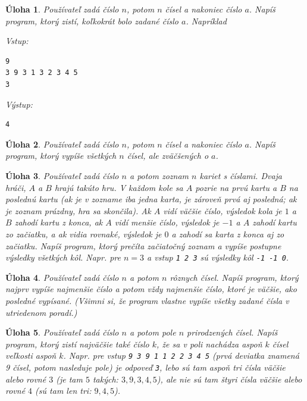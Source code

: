 \documentclass[10pt]{article}
\def\prg{\lstinline}
\def\ods{\vspace*{10pt}}
\newtheorem{uloha}{Úloha}
\def\bp{\begin{minipage}[t]{0.45\textwidth}\vspace{0pt}}
\def\ep{\end{minipage}}
\def\inp{{\rm Vstup:}\\[-4.2ex]}
\def\outp{{\rm Výstup:}\\[-4.2ex]}
\begin{document}
\begin{uloha}
  Používateľ zadá číslo $n$, potom $n$ čísel a nakoniec číslo $a$. Napíš
  program, ktorý zistí, koľkokrát bolo zadané číslo $a$. Napríklad

\ods
\bp
\inp
\begin{verbatim}
9
3 9 3 1 3 2 3 4 5 
3
\end{verbatim}
\ep
\hfill
\bp
\outp
\begin{verbatim}
4
\end{verbatim}
\ep
\end{uloha}

\begin{uloha}
  Používateľ zadá číslo $n$, potom $n$ čísel a nakoniec číslo $a$. Napíš
  program, ktorý vypíše všetkých $n$ čísel, ale zväčšených o $a$.
\end{uloha}

\begin{uloha}
   Používateľ zadá číslo $n$ a potom zoznam $n$ kariet s číslami. 
   Dvaja hráči, $A$ a $B$ hrajú takúto hru. V každom kole sa $A$ pozrie
   na prvú kartu a $B$ na poslednú kartu (ak je v zozname iba jedna karta,
   je zároveň prvá aj posledná; ak je zoznam prázdny, hra sa skončila).
   Ak $A$ vidí väčšie číslo, výsledok kola je $1$ a $B$ zahodí kartu z konca, 
   ak $A$ vidí menšie číslo, výsledok
   je $-1$ a $A$ zahodí kartu zo začiatku, a ak vidia rovnaké, výsledok je $0$
   a zahodí sa karta z konca aj zo začiatku.
   Napíš program, ktorý prečíta začiatočný zoznam a vypíše postupne výsledky
   všetkých kôl. Napr. pre $n=3$ a vstup {\tt 1 2 3} sú výsledky
   kôl {\tt -1 -1 0}.
\end{uloha}

\begin{uloha}
  \label{uloha:sort1}
  Používateľ zadá číslo $n$ a potom $n$ rôznych čísel. Napíš program, ktorý
  najprv vypíše najmenšie číslo a potom vždy najmenšie číslo, ktoré
  je väčšie, ako posledné vypísané. (Všimni si, že program vlastne
  vypíše všetky zadané čísla v utriedenom poradí.)
\end{uloha}

\begin{uloha}
  Používateľ zadá číslo $n$ a potom pole $n$ prirodzených čísel. Napíš program,
  ktorý zistí najväčšie také číslo $k$, že sa v poli nachádza aspoň $k$
  čísel veľkosti aspoň $k$. Napr. pre vstup \prg!9 3 9 1 1 2 2 3 4 5! (prvá
  deviatka znamená 9 čísel, potom nasleduje pole) je odpoveď \prg!3!, lebo
  sú tam aspoň tri čísla väčšie alebo rovné $3$ (je tam $5$ takých: $3, 9, 3, 4, 5$),
  ale nie sú tam štyri čísla väčšie alebo rovné $4$ (sú tam len tri: $9, 4, 5$).
\end{uloha}
\fi
\end{document}

